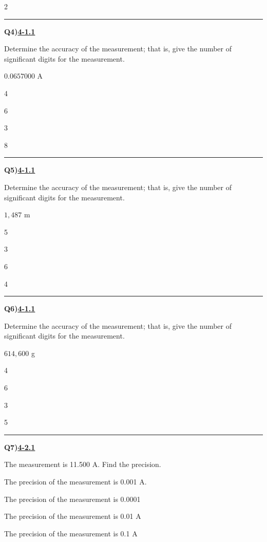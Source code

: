 \documentclass[11pt]{article}
\newenvironment{Qbox}[2]{%
  \par\medskip\noindent\begin{minipage}{\linewidth}%
  \hrule\medskip%
  \textbf{Q#1)}\hfill\textbf{\underline{#2}}\par\smallskip%
}{\par\end{minipage}\par\medskip}
\begin{document}
\begin{multicols}{2}
\begin{Qbox}{4}{4-1.1}
Determine the accuracy of the measurement; that is, give the number of significant digits for the measurement.\par\medskip $0.0657000$ A
\begin{choices}
  \item 4
  \item 6
  \item 3
  \item 8
\end{choices}
\end{Qbox}

\begin{Qbox}{5}{4-1.1}
Determine the accuracy of the measurement; that is, give the number of significant digits for the measurement.\par\medskip $1{,}487$ m
\begin{choices}
  \item 5
  \item 3
  \item 6
  \item 4
\end{choices}
\end{Qbox}

\begin{Qbox}{6}{4-1.1}
Determine the accuracy of the measurement; that is, give the number of significant digits for the measurement.\par\medskip $614{,}600$ g
\begin{choices}
  \item 4
  \item 6
  \item 3
  \item 5
\end{choices}
\end{Qbox}

\begin{Qbox}{7}{4-2.1}
The measurement is 11.500 A. Find the precision.
\begin{choices}
  \item The precision of the measurement is 0.001 A.
  \item The precision of the measurement is 0.0001
  \item The precision of the measurement is 0.01 A
  \item The precision of the measurement is 0.1 A
\end{choices}
\end{Qbox}


\end{multicols}
\end{document}
